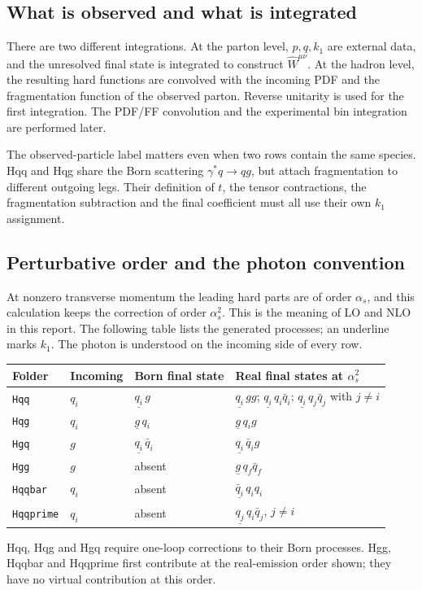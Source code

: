 \documentclass[11pt,a4paper]{article}
\newcommand{\What}{\widehat W}
\newcommand{\obs}[1]{\underline{#1}}
\begin{document}
\subsection{What is observed and what is integrated}

There are two different integrations. At the parton level, $p,q,k_1$
are external data, and the unresolved final state is integrated to
construct $\What^{\mu\nu}$. At the hadron level, the resulting hard
functions are convolved with the incoming PDF and the fragmentation
function of the observed parton. Reverse unitarity is used for the first
integration. The PDF/FF convolution and the experimental bin integration
are performed later.

The observed-particle label matters even when two rows contain the same
species. Hqq and Hqg share the Born scattering $\gamma^*q\to qg$, but
attach fragmentation to different outgoing legs. Their definition of
$t$, the tensor contractions, the fragmentation subtraction and the final
coefficient must all use their own $k_1$ assignment.

\subsection{Perturbative order and the photon convention}

At nonzero transverse momentum the leading hard parts are of order
$\alpha_s$, and this calculation keeps the correction of order
$\alpha_s^2$. This is the meaning of LO and NLO in this report.
The following table lists the generated processes; an underline marks $k_1$.
The photon is understood on the incoming side of every row.

\begin{center}
\small
\begin{tabularx}{\textwidth}{@{}l l l X@{}}
\toprule
Folder & Incoming & Born final state & Real final states at $\alpha_s^2$\\
\midrule
\texttt{Hqq} & $q_i$ & $\obs{q_i}\,g$ &
 $\obs{q_i}\,gg$; $\obs{q_i}\,q_i\bar q_i$;
 $\obs{q_i}\,q_j\bar q_j$ with $j\ne i$\\
\texttt{Hqg} & $q_i$ & $\obs{g}\,q_i$ & $\obs{g}\,q_i g$\\
\texttt{Hgq} & $g$ & $\obs{q_i}\,\bar q_i$ & $\obs{q_i}\,\bar q_i g$\\
\texttt{Hgg} & $g$ & absent & $\obs{g}\,q_f\bar q_f$\\
\texttt{Hqqbar} & $q_i$ & absent & $\obs{\bar q_i}\,q_i q_i$\\
\texttt{Hqqprime} & $q_i$ & absent & $\obs{q_j}\,q_i\bar q_j$, $j\ne i$\\
\bottomrule
\end{tabularx}
\end{center}
Hqq, Hqg and Hgq require one-loop corrections to their Born processes.
Hgg, Hqqbar and Hqqprime first contribute at the real-emission order shown;
they have no virtual contribution at this order.
\end{document}
